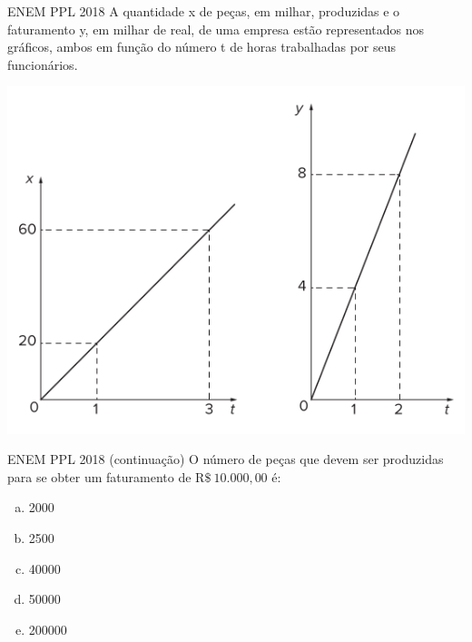 \documentclass[11pt]{beamer}
\begin{document}
\begin{frame}{ENEM PPL 2018}
    A quantidade x de peças, em milhar, produzidas e o faturamento y, em milhar de real, de uma empresa estão representados nos gráficos, ambos em função do número t de horas trabalhadas por seus funcionários.

    \begin{center}
        \includegraphics[scale=0.4]{imagens/enem-ppl-2018.png}
    \end{center}
    
\end{frame}

\begin{frame}{ENEM PPL 2018 (continuação)}
     O número de peças que devem ser produzidas para se obter um faturamento de R$\$\  10.000,00$ é:

    \begin{enumerate}[a)]
        \item 2000
        \item 2500
        \item 40000
        \item 50000 %
        \item 200000
    \end{enumerate}
\end{frame}
\end{document}

